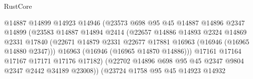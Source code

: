 \begin{lexlean}{RustCore}
\begin{coremodule}
                                    @14887
                                    @14899
                                    @14923
                                    @14946
                                    (@23573
                                      @698
                                      @95
                                      @45
                                      @14887
                                      @14896
                                      @2347
                                      @14899
                                      (@23583
                                        @14887
                                        @14894
                                        @2414
                                        (@22657
                                          @14886
                                          @14893
                                          @2324
                                          @14869
                                          @2331
                                          @17840
                                          (@22671
                                            @14879
                                            @2331
                                            @22677
                                            @17881
                                            @16963
                                            (@16946 (@16965 @14880 @2347)))
                                          @16963
                                          (@16946 (@16965 @14870 @14886)))
                                        @17161
                                        @17164
                                        @17167
                                        @17171
                                        @17176
                                        @17182)
                                      (@22702
                                        @14896
                                        @698
                                        @95
                                        @45
                                        @2347
                                        @9804
                                        @2347
                                        @2442
                                        @34189
                                        @23008))
                                    (@23724
                                      @1758
                                      @95
                                      @45
                                      @14923
                                      @14932

\end{coremodule}
\end{lexlean}

